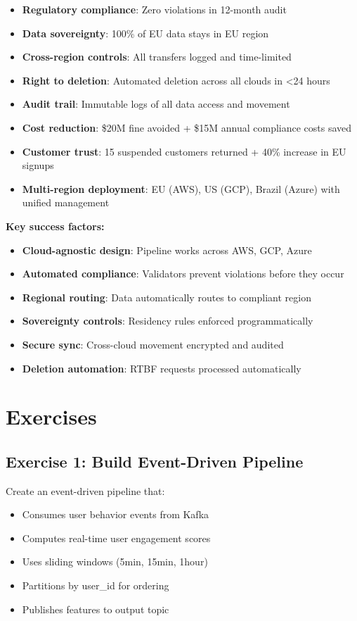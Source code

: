 \begin{itemize}
    \item \textbf{Regulatory compliance}: Zero violations in 12-month audit
    \item \textbf{Data sovereignty}: 100\% of EU data stays in EU region
    \item \textbf{Cross-region controls}: All transfers logged and time-limited
    \item \textbf{Right to deletion}: Automated deletion across all clouds in <24 hours
    \item \textbf{Audit trail}: Immutable logs of all data access and movement
    \item \textbf{Cost reduction}: \$20M fine avoided + \$15M annual compliance costs saved
    \item \textbf{Customer trust}: 15 suspended customers returned + 40\% increase in EU signups
    \item \textbf{Multi-region deployment}: EU (AWS), US (GCP), Brazil (Azure) with unified management
\end{itemize}

\textbf{Key success factors:}
\begin{itemize}
    \item \textbf{Cloud-agnostic design}: Pipeline works across AWS, GCP, Azure
    \item \textbf{Automated compliance}: Validators prevent violations before they occur
    \item \textbf{Regional routing}: Data automatically routes to compliant region
    \item \textbf{Sovereignty controls}: Residency rules enforced programmatically
    \item \textbf{Secure sync}: Cross-cloud movement encrypted and audited
    \item \textbf{Deletion automation}: RTBF requests processed automatically
\end{itemize}

\section{Exercises}

\subsection{Exercise 1: Build Event-Driven Pipeline}

Create an event-driven pipeline that:
\begin{itemize}
    \item Consumes user behavior events from Kafka
    \item Computes real-time user engagement scores
    \item Uses sliding windows (5min, 15min, 1hour)
    \item Partitions by user\_id for ordering
    \item Publishes features to output topic
\end{itemize}


